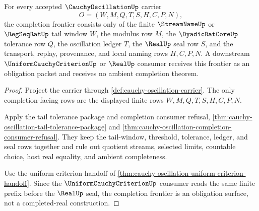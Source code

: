 \begin{theorem}
\label{thm:cauchy-oscillation-completion-frontier-obligation}
For every accepted $\CauchyOscillationUp$ carrier
$$
O=(W,M,Q,T,S,H,C,P,N),
$$
the completion frontier consists only of the finite $\StreamNameUp$ or $\RegSeqRatUp$ tail window $W$, the modulus row $M$, the $\DyadicRatCoreUp$ tolerance row $Q$, the oscillation ledger $T$, the $\RealUp$ seal row $S$, and the transport, replay, provenance, and local naming rows $H,C,P,N$. A downstream $\UniformCauchyCriterionUp$ or $\RealUp$ consumer receives this frontier as an obligation packet and receives no ambient completion theorem.
\end{theorem}
\begin{proof}
Project the carrier through \autoref{def:cauchy-oscillation-carrier}. The only completion-facing rows are the displayed finite rows $W,M,Q,T,S,H,C,P,N$.

Apply the tail tolerance package and completion consumer refusal, \autoref{thm:cauchy-oscillation-tail-tolerance-package} and \autoref{thm:cauchy-oscillation-completion-consumer-refusal}. They keep the tail-window, threshold, tolerance, ledger, and seal rows together and rule out quotient streams, selected limits, countable choice, host real equality, and ambient completeness.

Use the uniform criterion handoff of \autoref{thm:cauchy-oscillation-uniform-criterion-handoff}. Since the $\UniformCauchyCriterionUp$ consumer reads the same finite prefix before the $\RealUp$ seal, the completion frontier is an obligation surface, not a completed-real construction.
\end{proof}

